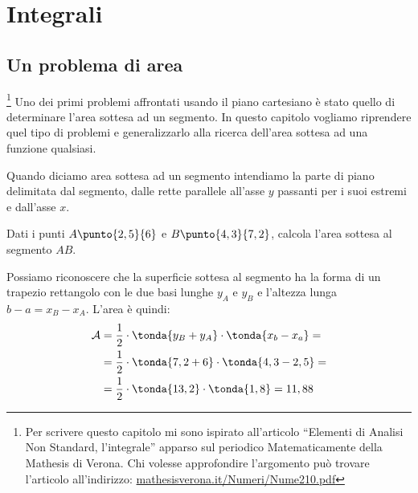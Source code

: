 


% 

\chapter{Integrali}

\section{Un problema di area}
\label{sec:integrali_area}

\footnote{Per scrivere questo capitolo mi sono ispirato 
all'articolo ``Elementi di Analisi Non Standard, l'integrale'' apparso sul 
periodico Matematicamente della Mathesis di Verona. 
Chi volesse approfondire l'argomento può trovare l'articolo 
all'indirizzo: 
\href{http://mathesisverona.it/Numeri/Nume210.pdf}
     {mathesisverona.it/Numeri/Nume210.pdf}}
Uno dei primi problemi affrontati usando il piano cartesiano è stato quello 
di determinare l'area sottesa ad un segmento. In questo capitolo vogliamo 
riprendere quel tipo di problemi e generalizzarlo alla ricerca dell'area 
sottesa ad una funzione qualsiasi.

Quando diciamo area sottesa ad un segmento intendiamo la parte di piano 
delimitata dal segmento, dalle rette parallele all'asse \(y\) passanti per i 
suoi estremi e dall'asse \(x\).

\begin{esempio}
Dati i punti \(A \punto{2,5}{6}\) e \(B \punto{4,3}{7,2}\), calcola l'area 
sottesa al segmento \(AB\).

\begin{minipage}{.29\textwidth}
\begin{inaccessibleblock}
  \areasottesasegmento
\end{inaccessibleblock}
\end{minipage}
\hfill
\begin{minipage}{.69\textwidth}
 Possiamo riconoscere che la superficie sottesa al segmento ha la forma di un 
trapezio rettangolo con le due basi lunghe \(y_A\) e \(y_B\) e l'altezza 
lunga \(b - a = x_B - x_A\). L'area è quindi:
\begin{align*}
 \mathcal{A} &= \frac{1}{2} \cdot \tonda{y_B + y_A} \cdot \tonda{x_b - x_a}=\\
             &= \frac{1}{2} \cdot \tonda{7,2 + 6} \cdot \tonda{4,3 - 2,5} =\\
             &= \frac{1}{2} \cdot \tonda{13,2} \cdot \tonda{1,8} = 11,88
\end{align*}
\end{minipage}
\end{esempio}

